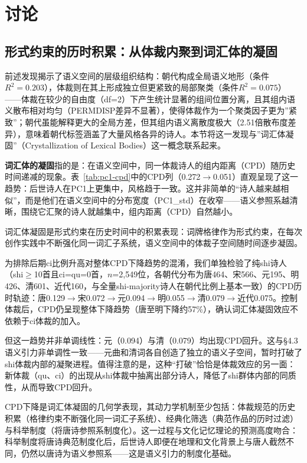\documentclass[12pt,a4paper]{article}
\numberwithin{equation}{section}
\begin{document}
\section{讨论}

\subsection{形式约束的历时积累：从体裁内聚到词汇体的凝固}

前述发现揭示了语义空间的层级组织结构：朝代构成全局语义地形（条件$R^{2}=0.203$），体裁则在其上形成独立但更紧致的局部聚类（条件$R^{2}=0.075$）——体裁在较少的自由度（df=2）下产生统计显著的组间位置分离，且其组内语义散布相对均匀（PERMDISP差异不显著），使得体裁作为一个聚类因子更为”紧致”；朝代虽能解释更大的全局方差，但其组内语义离散度极大（2.51倍散布度差异），意味着朝代标签涵盖了大量风格各异的诗人。本节将这一发现与”词汇体凝固”（Crystallization of Lexical Bodies）这一概念联系起来。

\textbf{词汇体的凝固}指的是：在语义空间中，同一体裁诗人的组内距离（CPD）随历史时间递减的现象。表~\ref{tab:pc1-cpd}中的CPD列（0.272$\rightarrow$0.051）直观呈现了这一趋势：后世诗人在PC1上更集中，风格趋于一致。这并非简单的“诗人越来越相似”，而是他们在语义空间中的分布宽度（PC1\_std）在收窄——语义参照系越清晰，围绕它汇聚的诗人就越集中，组内距离（CPD）自然越小。

词汇体凝固是形式约束在历史时间中的积累表现：词牌格律作为形式约束，在每次创作实践中不断强化同一词汇子系统，语义空间中的体裁子空间随时间逐步凝固。

为排除后期ci比例升高对整体CPD下降趋势的混淆，我们单独检验了纯shi诗人（shi$\ge$10首且ci=qu=0首，$n$=2,549位，各朝代分布为唐464、宋566、元195、明426、清601、近代160，与全量shi-majority诗人在朝代比例上基本一致）的CPD历时轨迹：唐0.129$\rightarrow$宋0.072$\rightarrow$元0.094$\rightarrow$明0.055$\rightarrow$清0.079$\rightarrow$近代0.075。控制体裁后，CPD仍呈现整体下降趋势（唐至明下降约57\%），确认词汇体凝固效应不依赖于ci体裁的加入。

但这一趋势并非单调线性：元（0.094）与清（0.079）均出现CPD回升。这与§4.3语义引力非单调性一致——元曲和清词各自创造了独立的语义子空间，暂时打破了shi体裁内部的凝聚进程。值得注意的是，这种“打破”恰恰是体裁效应的另一面：新体裁（qu、ci）的出现从shi体裁中抽离出部分诗人，降低了shi群体内部的同质性，从而导致CPD回升。

CPD下降是词汇体凝固的几何学表现，其动力学机制至少包括：体裁规范的历史积累（格律约束不断强化同一词汇子系统）、经典化筛选（典范作品的历时过滤）与科举制度（将唐诗参照系制度化）。这一过程与文化记忆理论的预测高度吻合：科举制度将唐诗典范制度化后，后世诗人即便在地理和文化背景上与唐人截然不同，仍然以唐诗为语义参照系——这是语义引力的制度化基础。
\end{document}
